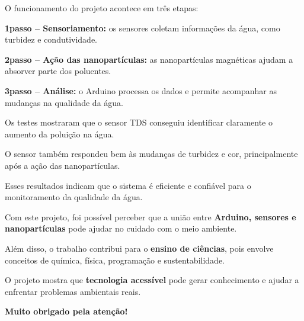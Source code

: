 \documentclass[12pt]{article}
\begin{document}
\begin{tcolorbox}[colback=blue!5,colframe=azul,title=\textbf{Como o Sistema Funciona}]
O funcionamento do projeto acontece em tr\^es etapas:

\textbf{1\textordmasculine passo -- Sensoriamento:} os sensores coletam informa\c{c}\~oes da \'agua, como turbidez e condutividade.

\textbf{2\textordmasculine passo -- A\c{c}\~ao das nanopart\'iculas:} as nanopart\'iculas magn\'eticas ajudam a absorver parte dos poluentes.

\textbf{3\textordmasculine passo -- An\'alise:} o Arduino processa os dados e permite acompanhar as mudan\c{c}as na qualidade da \'agua.
\end{tcolorbox}

\begin{tcolorbox}[colback=green!5,colframe=verde,title=\textbf{Resultados}]
Os testes mostraram que o sensor TDS conseguiu identificar claramente o aumento da polui\c{c}\~ao na \'agua.

O sensor \optico tamb\'em respondeu bem \`as mudan\c{c}as de turbidez e cor, principalmente ap\'os a a\c{c}\~ao das nanopart\'iculas.

Esses resultados indicam que o sistema \'{e} eficiente e confi\'avel para o monitoramento da qualidade da \'agua.
\end{tcolorbox}

\begin{tcolorbox}[colback=orange!5,colframe=laranja,title=\textbf{Conclus\~ao}]
Com este projeto, foi poss\'ivel perceber que a uni\~ao entre \textbf{Arduino, sensores e nanopart\'iculas} pode ajudar no cuidado com o meio ambiente.

Al\'em disso, o trabalho contribui para o \textbf{ensino de ci\^encias}, pois envolve conceitos de qu\'imica, f\'isica, programa\c{c}\~ao e sustentabilidade.

O projeto mostra que \textbf{tecnologia acess\'ivel} pode gerar conhecimento e ajudar a enfrentar problemas ambientais reais.

\textbf{Muito obrigado pela aten\c{c}\~ao!}
\end{tcolorbox}
\end{document}
